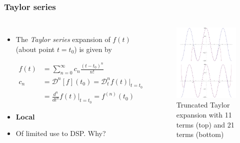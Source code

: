 \documentclass{beamer}
\begin{document}
\begin{frame}
\frametitle{Taylor series}
\begin{columns}[c]
\begin{itemize}
	\item The \textit{Taylor series} expansion of $f(t)$ (about point $t=t_0$) is given by

	\begin{align*}
		f(t)	&= \sum_{n=0}^{\infty} c_n \frac{(t-t_0)^n}{n!} \\
		c_n		&= \mathcal{D}^n[f](t_0) = \mathcal{D}_t^n f(t) |_{t=t_0} \\
				&= \frac{d^n}{dt^n} f(t) |_{t=t_0} = f^{(n)}(t_0)
	\end{align*}
	\item \textbf{Local}
	\item Of limited use to DSP. \alert{Why?}
\end{itemize}
\begin{figure} %
\centering
	\includegraphics[width=\columnwidth]{../figures/taylor}
\caption{Truncated Taylor expansion with 11 terms (top) and 21 terms (bottom)}
\end{figure}
\end{columns}

\end{frame}
\end{document}
